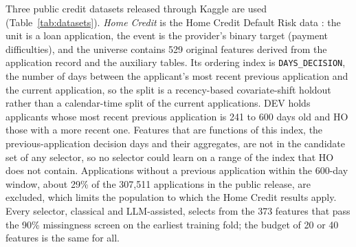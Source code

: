 \documentclass[final,5p,twocolumn]{elsarticle}
\begin{document}
Three public credit datasets released through Kaggle are used (Table~\ref{tab:datasets}). \emph{Home Credit} is the Home Credit Default Risk data \cite{homecredit2018}: the unit is a loan application, the event is the provider's binary target (payment difficulties), and the universe contains 529 original features derived from the application record and the auxiliary tables. Its ordering index is \texttt{DAYS\_DECISION}, the number of days between the applicant's most recent previous application and the current application, so the split is a recency-based covariate-shift holdout rather than a calendar-time split of the current applications. DEV holds applicants whose most recent previous application is 241 to 600 days old and HO those with a more recent one. Features that are functions of this index, the previous-application decision days and their aggregates, are not in the candidate set of any selector, so no selector could learn on a range of the index that HO does not contain. Applications without a previous application within the 600-day window, about 29\% of the 307,511 applications in the public release, are excluded, which limits the population to which the Home Credit results apply. Every selector, classical and LLM-assisted, selects from the 373 features that pass the 90\% missingness screen on the earliest training fold; the budget of 20 or 40 features is the same for all.
\end{document}
